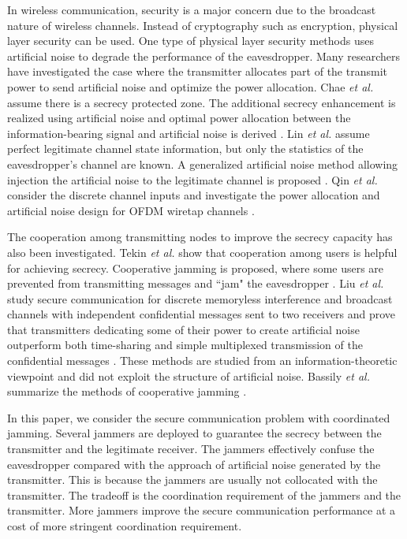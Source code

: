 \documentclass[conference]{IEEEtran}
\begin{document}
In wireless communication, security is a major concern due to the broadcast nature of wireless channels. Instead of cryptography such as encryption, physical layer security can be used. One type of physical layer security methods uses artificial noise to degrade the performance of the eavesdropper. Many researchers have investigated the case where the transmitter allocates part of the transmit power to send artificial noise and optimize the power allocation. Chae \emph{et al.} assume there is a secrecy protected zone. The additional secrecy enhancement is realized using artificial noise and optimal power allocation between the information-bearing signal and artificial noise is derived \cite{chae2014enhanced}.  Lin \emph{et al.} assume perfect legitimate channel state information, but only the statistics of the eavesdropper's channel are known. A generalized artificial noise method allowing injection the artificial noise to the legitimate channel is proposed \cite{lin2013secrecy}. Qin \emph{et al.} consider the discrete channel inputs and investigate the power allocation and artificial noise design for OFDM wiretap channels \cite{qin2013power}.

The cooperation among transmitting nodes to improve the secrecy capacity has also been investigated. Tekin \emph{et al.} show that cooperation among users is helpful for achieving secrecy. Cooperative jamming is proposed,  where some users are prevented from transmitting messages and ``jam" the eavesdropper \cite{tekin2008general}. Liu \emph{et al.} study secure communication for discrete memoryless interference and broadcast channels with independent confidential messages sent to two receivers and prove that transmitters dedicating some of their power to create artificial noise outperform both time-sharing and simple multiplexed transmission of the confidential messages \cite{liu2008discrete}. These methods are studied from an information-theoretic viewpoint and did not exploit the structure of artificial noise. Bassily \emph{et al.} summarize the methods of cooperative jamming \cite{cooperative_jamming}.


In this paper, we consider the secure communication problem with coordinated jamming.   Several jammers are deployed to guarantee the secrecy between the transmitter and the legitimate receiver.  The jammers effectively confuse the eavesdropper compared with the approach of artificial noise generated by the transmitter.  This is because the jammers are usually not collocated with the transmitter.  The tradeoff is the coordination requirement of the jammers and the transmitter.  More jammers improve the secure communication performance at a cost of more stringent coordination requirement. 
\end{document}
